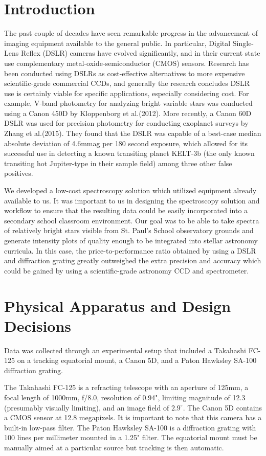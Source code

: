\documentclass[prb,preprint]{revtex4-1}
\begin{document}
\section{Introduction}
	The past couple of decades have seen remarkable progress in the advancement of imaging equipment available to the general public. In particular, Digital Single-Lens Reflex (DSLR) cameras have evolved significantly, and in their current state use complementary metal-oxide-semiconductor (CMOS) sensors. Research has been conducted using DSLRs as cost-effective alternatives to more expensive scientific-grade commercial CCDs, and generally the research concludes DSLR use is certainly viable for specific applications, especially considering cost. For example, V-band photometry for analyzing bright variable stars was conducted using a Canon 450D by Kloppenborg et al.\@(2012).\cite{vbpdslr} More recently, a Canon 60D DSLR was used for precision photometry for conducting exoplanet surveys by Zhang et al.\@(2015).\cite{mbpdslr} They found that the DSLR was capable of a best-case median absolute deviation of 4.6mmag per 180 second exposure, which allowed for its successful use in detecting a known transiting planet KELT-3b (the only known transiting hot Jupiter-type in their sample field) among three other false positives.
	
	We developed a low-cost spectroscopy solution which utilized equipment already available to us. It was important to us in designing the spectroscopy solution and workflow to ensure that the resulting data could be easily incorporated into a secondary school classroom environment. Our goal was to be able to take spectra of relatively bright stars visible from St. Paul's School observatory grounds and generate intensity plots of quality enough to be integrated into stellar astronomy curricula. In this case, the price-to-performance ratio obtained by using a DSLR and diffraction grating greatly outweighed the extra precision and accuracy which could be gained by using a scientific-grade astronomy CCD and spectrometer.
	
\section{Physical Apparatus and Design Decisions}
	Data was collected through an experimental setup that included a Takahashi FC-125 on a tracking equatorial mount, a Canon 5D, and a Paton Hawksley SA-100 diffraction grating.
	
	The Takahashi FC-125 is a refracting telescope with an aperture of 125mm, a focal length of 1000mm, f/8.0, resolution of 0.94", limiting magnitude of 12.3 (presumably visually limiting), and an image field of $2.9^{\circ}$.\cite{fc125spec} The Canon 5D contains a CMOS sensor at 12.8 megapixels. It is important to note that this camera has a built-in low-pass filter.\cite{5dspec} The Paton Hawksley SA-100 is a diffraction grating with 100 lines per millimeter mounted in a 1.25" filter. The equatorial mount must be manually aimed at a particular source but tracking is then automatic.
	
\end{document}
